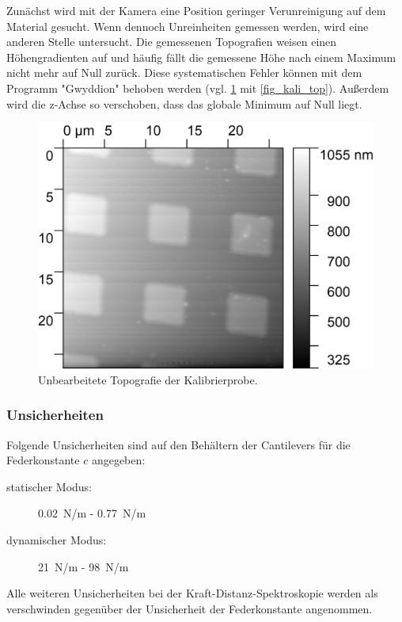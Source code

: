 \documentclass[
	a4paper,
	12pt,
	pagesize,
	ngerman
]{scrartcl}
\begin{document}
	Zunächst wird mit der Kamera eine Position geringer Verunreinigung auf dem Material gesucht.
	Wenn dennoch Unreinheiten gemessen werden, wird eine anderen Stelle untersucht.
	Die gemessenen Topografien weisen einen Höhengradienten auf und häufig fällt die gemessene Höhe nach einem Maximum nicht mehr auf Null zurück.
	Diese systematischen Fehler können mit dem Programm "Gwyddion" behoben werden (vgl. \cref{fig_kali_raw} mit \cref{fig_kali_top}).
	Außerdem wird die z-Achse so verschoben, dass das globale Minimum auf Null liegt.

	\begin{figure}[H]
			\includegraphics[width=.6\linewidth]{images/Kali/raw}
			\caption{Unbearbeitete Topografie der Kalibrierprobe.}
			\label{fig_kali_raw}
	\end{figure}

\subsubsection{Unsicherheiten}
	Folgende Unsicherheiten sind auf den Behältern der Cantilevers für die Federkonstante $c$ angegeben:
	\begin{description}
		\item[statischer Modus:] \SI{0.02}{N/m} - \SI{0.77}{N/m} %
		\item[dynamischer Modus:] \SI{21}{N/m} - \SI{98}{N/m}
	\end{description}
	Alle weiteren Unsicherheiten bei der Kraft-Distanz-Spektroskopie werden als verschwinden gegenüber der Unsicherheit der Federkonstante angenommen.
\end{document}
